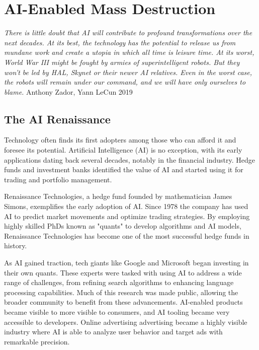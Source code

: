 \setchapterpreamble[u]{\margintoc}
\chapter{AI-Enabled Mass Destruction}

\textit{There is little doubt that AI will contribute to profound transformations over the next decades. At its best, the technology has the potential to release us from mundane work and create a utopia in which all time is leisure time. At its worst, World War III might be fought by armies of superintelligent robots. But they won’t be led by HAL, Skynet or their newer AI relatives. Even in the worst case, the robots will remain under our command, and we will have only ourselves to blame.} Anthony Zador, Yann LeCun 2019 \cite{dontfearterminator}


\section{The AI Renaissance}

Technology often finds its first adopters among those who can afford it and foresee its potential. Artificial Intelligence (AI) is no exception, with its early applications dating back several decades, notably in the financial industry. Hedge funds and investment banks identified the value of AI and started using it for trading and portfolio management.

Renaissance Technologies, a hedge fund founded by mathematician James Simons, exemplifies the early adoption of AI. Since 1978 the company has used AI to predict market movements and optimize trading strategies. By employing highly skilled PhDs known as "quants" to develop algorithms and AI models, Renaissance Technologies has become one of the most successful hedge funds in history.

As AI gained traction, tech giants like Google and Microsoft began investing in their own quants. These experts were tasked with using AI to address a wide range of challenges, from refining search algorithms to enhancing language processing capabilities. Much of this research was made public, allowing the broader community to benefit from these advancements. AI-enabled products became visible to more visible to consumers, and AI tooling became very accessible to developers. Online advertising advertising became a highly visible industry where AI is able to analyze user behavior and target ads with remarkable precision.

